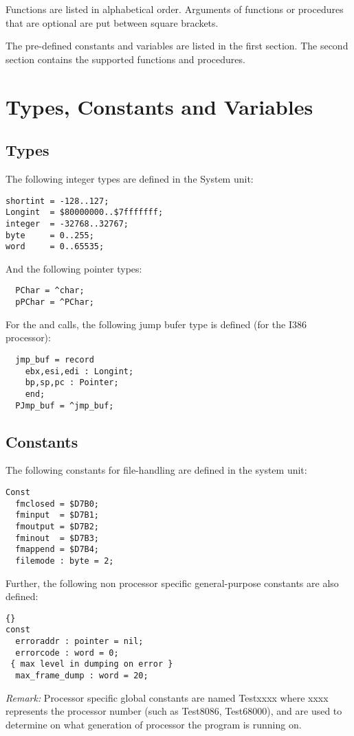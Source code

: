 \documentclass{report}
\begin{document}
Functions are listed in alphabetical order. Arguments of functions or 
procedures that are optional are put between square brackets.

The pre-defined constants and variables are listed in the first section. The
second section contains the supported functions and procedures.

\section{Types, Constants and Variables}
\subsection{Types}
The following integer types are defined in the System unit:
\begin{verbatim}
shortint = -128..127;
Longint  = $80000000..$7fffffff;
integer  = -32768..32767;
byte     = 0..255;
word     = 0..65535;
\end{verbatim}
And the following pointer types:
\begin{verbatim}
  PChar = ^char;
  pPChar = ^PChar;
\end{verbatim}
For the  and  calls, the following jump bufer
type is defined (for the I386 processor):
\begin{verbatim}
  jmp_buf = record
    ebx,esi,edi : Longint;
    bp,sp,pc : Pointer;
    end;
  PJmp_buf = ^jmp_buf;
\end{verbatim}
\subsection{Constants}
The following constants for file-handling are defined in the system unit:
\begin{verbatim}
Const
  fmclosed = $D7B0;
  fminput  = $D7B1;
  fmoutput = $D7B2;
  fminout  = $D7B3;
  fmappend = $D7B4;
  filemode : byte = 2;
\end{verbatim}
Further, the following non processor specific general-purpose constants
are also defined:
\begin{lstlisting}{}
const
  erroraddr : pointer = nil;
  errorcode : word = 0;
 { max level in dumping on error }
  max_frame_dump : word = 20;
\end{lstlisting}{}
\emph{ Remark: } Processor specific global constants are named Testxxxx
where xxxx represents the processor number (such as Test8086, Test68000),
and are used to determine on what generation of processor the program
is running on.
\end{document}
